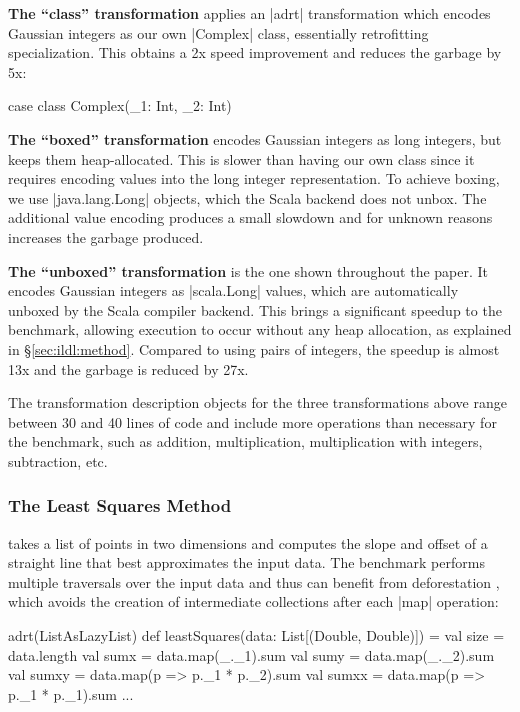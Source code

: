 \noindent
\textbf{The ``class'' transformation} applies an |adrt| transformation which encodes Gaussian integers as our own |Complex| class, essentially retrofitting specialization. This obtains a 2x speed improvement and reduces the garbage by 5x:

\begin{lstlisting-nobreak}
case class Complex(_1: Int, _2: Int)
\end{lstlisting-nobreak}


\noindent
\textbf{The ``boxed'' transformation} encodes Gaussian integers as long integers, but keeps them heap-allocated. This is slower than having our own class since it requires encoding values into the long integer representation. To achieve boxing, we use |java.lang.Long| objects, which the Scala backend does not unbox. The additional value encoding produces a small slowdown and for unknown reasons increases the garbage produced.


\noindent
\textbf{The ``unboxed'' transformation} is the one shown throughout the paper. It encodes Gaussian integers as |scala.Long| values, which are automatically unboxed by the Scala compiler backend. This brings a significant speedup to the benchmark, allowing execution to occur without any heap allocation, as explained in \S\ref{sec:ildl:method}. Compared to using pairs of integers, the speedup is almost 13x and the garbage is reduced by
27x.


\noindent
The transformation description objects for the three transformations above range between 30 and 40 lines of code and include more operations than necessary for the benchmark, such as addition, multiplication, multiplication with integers, subtraction, etc.


\subsubsection*{The Least Squares Method} takes a list of points in two dimensions and computes the slope and offset of a straight line that best approximates the input data. The benchmark performs multiple traversals over the input data and thus can benefit from deforestation \cite{wadler-deforestation}, which avoids the creation of intermediate collections after each |map| operation:

\begin{lstlisting-nobreak}
adrt(ListAsLazyList){
  def leastSquares(data: List[(Double, Double)]) = {
    val size = data.length
    val sumx = data.map(_._1).sum
    val sumy = data.map(_._2).sum
    val sumxy = data.map(p => p._1 * p._2).sum
    val sumxx = data.map(p => p._1 * p._1).sum
    ...
  }
}
\end{lstlisting-nobreak}

